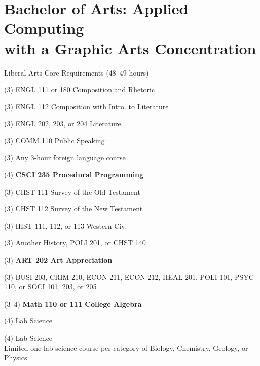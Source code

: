 %
\section*{Bachelor of Arts: Applied Computing\\with a Graphic Arts Concentration}

\begin{reqgroup}{Liberal Arts Core Requirements (48--49 hours)}
\begin{checklist}
\begin{minipage}[t]{0.5\linewidth}
	\item (3) ENGL 111 or 180 Composition and Rhetoric
	\item (3) ENGL 112 Composition with Intro\@. to Literature
	\item (3) ENGL 202, 203, or 204 Literature
	\item (3) COMM 110 Public Speaking
	\item (3) Any 3-hour foreign language course
	\item (4) \textbf{CSCI 235  Procedural Programming}
	\item (3) CHST 111  Survey of the Old Testament
	\item (3) CHST 112  Survey of the New Testament
	\item (3) HIST 111, 112, or 113 Western Civ.
\end{minipage}
\begin{minipage}[t]{0.5\linewidth}
	\item (3)	Another History, POLI 201, or CHST 140
	\item (3)	\textbf{ART 202 Art Appreciation}
	\item (3)	BUSI 203, CRIM 210, ECON 211, ECON 212, HEAL 201, POLI 101, PSYC 110, or SOCI 101, 203, or 205
	\item (3--4)	\textbf{Math 110 or 111 College Algebra}
	\item (4)	Lab Science
	\item (4)	Lab Science\\Limited one lab science course per category of Biology, Chemistry,
Geology, or Physics.
\end{minipage}
\end{checklist}
\end{reqgroup}

